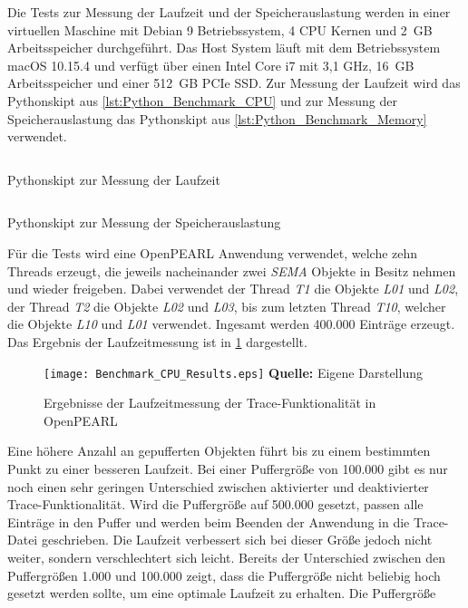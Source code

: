 Die Tests zur Messung der Laufzeit und der Speicherauslastung werden in einer
virtuellen Maschine mit Debian 9 Betriebssystem, 4 CPU Kernen und 2~GB
Arbeitsspeicher durchgeführt. Das Host System läuft mit dem Betriebssystem macOS
10.15.4 und verfügt über einen Intel Core i7 mit 3,1 GHz, 16~GB Arbeitsspeicher
und einer 512~GB PCIe SSD. Zur Messung der Laufzeit wird das Pythonskipt aus
\cref{lst:Python_Benchmark_CPU} und zur Messung der Speicherauslastung das
Pythonskipt aus \cref{lst:Python_Benchmark_Memory} verwendet.
\begin{listing}[ht]
  \inputminted[frame=lines,linenos]{python}{./Python/benchmark_cpu.py}
  \caption{Pythonskipt zur Messung der Laufzeit}
  \label{lst:Python_Benchmark_CPU}
\end{listing} 
\begin{listing}[ht]
  \inputminted[frame=lines,linenos]{python}{./Python/benchmark_memory.py}
  \caption{Pythonskipt zur Messung der Speicherauslastung}
  \label{lst:Python_Benchmark_Memory}
\end{listing}
Für die Tests wird eine OpenPEARL Anwendung verwendet, welche zehn Threads
erzeugt, die jeweils nacheinander zwei \emph{SEMA} Objekte in Besitz nehmen und
wieder freigeben. Dabei verwendet der Thread \emph{T1} die Objekte
\emph{L01} und \emph{L02}, der Thread \emph{T2} die Objekte \emph{L02}
und \emph{L03}, bis zum letzten Thread \emph{T10}, welcher die Objekte
\emph{L10} und \emph{L01} verwendet. Ingesamt werden 400.000 Einträge erzeugt.
Das Ergebnis der Laufzeitmessung ist in \cref{fig:BenchmarkCpuResults}
dargestellt. 
\begin{figure}[ht]
  \texttt{[image: Benchmark\_CPU\_Results.eps]}
  \footnotesize\sffamily\textbf{Quelle:} Eigene Darstellung
  \caption{Ergebnisse der Laufzeitmessung der Trace-Funktionalität in OpenPEARL}
  \label{fig:BenchmarkCpuResults}
\end{figure}
Eine höhere Anzahl an gepufferten Objekten führt bis zu einem bestimmten Punkt
zu einer besseren Laufzeit. Bei einer Puffergröße von 100.000 gibt es nur noch
einen sehr geringen Unterschied zwischen aktivierter und deaktivierter
Trace-Funktionalität. Wird die Puffergröße auf 500.000 gesetzt, passen alle
Einträge in den Puffer und werden beim Beenden der Anwendung in die Trace-Datei
geschrieben. Die Laufzeit verbessert sich bei dieser Größe jedoch nicht weiter,
sondern verschlechtert sich leicht. Bereits der Unterschied zwischen den
Puffergrößen 1.000 und 100.000 zeigt, dass die Puffergröße nicht beliebig hoch
gesetzt werden sollte, um eine optimale Laufzeit zu erhalten. Die Puffergröße
